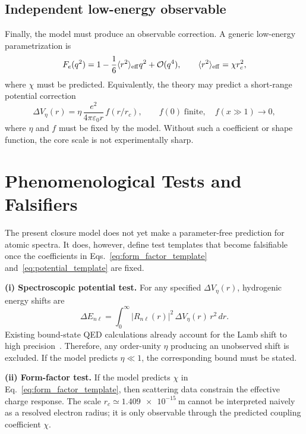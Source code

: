 \documentclass[aps,pra,preprint,longbibliography,nofootinbib]{revtex4-2}
\begin{document}
\subsection{Independent low-energy observable}

Finally, the model must produce an observable correction.  A generic
low-energy parametrization is
\begin{equation}
  F_e(q^2)=1-\frac{1}{6}\langle r^2\rangle_{\rm eff}q^2+\mathcal{O}(q^4),
  \qquad
  \langle r^2\rangle_{\rm eff}=\chi r_c^2,
  \label{eq:form_factor_template}
\end{equation}
where $\chi$ must be predicted.  Equivalently, the theory may predict a
short-range potential correction
\begin{equation}
  \Delta V_\eta(r)=
  \eta\,\frac{e^2}{4\pi\varepsilon_0 r}\,f(r/r_c),
  \qquad f(0)\;\mathrm{finite},\quad f(x\gg1)\to0,
  \label{eq:potential_template}
\end{equation}
where $\eta$ and $f$ must be fixed by the model.  Without such a
coefficient or shape function, the core scale is not experimentally
sharp.

\section{Phenomenological Tests and Falsifiers}
\label{sec:falsifiers}

The present closure model does not yet make a parameter-free prediction
for atomic spectra.  It does, however, define test templates that become
falsifiable once the coefficients in Eqs.~\eqref{eq:form_factor_template}
and~\eqref{eq:potential_template} are fixed.

\medskip
\noindent\textbf{(i) Spectroscopic potential test.}
For any specified $\Delta V_\eta(r)$, hydrogenic energy shifts are
\begin{equation}
  \Delta E_{n\ell}
  = \int_0^\infty |R_{n\ell}(r)|^2\,\Delta V_\eta(r)\,r^2\,dr.
  \label{eq:lamb_template}
\end{equation}
Existing bound-state QED calculations already account for the Lamb
shift to high precision~\cite{Bethe1947,Karshenboim2005}.  Therefore,
any order-unity $\eta$ producing an unobserved shift is excluded.  If the
model predicts $\eta\ll1$, the corresponding bound must be stated.

\medskip
\noindent\textbf{(ii) Form-factor test.}
If the model predicts $\chi$ in Eq.~\eqref{eq:form_factor_template}, then
scattering data constrain the effective charge response.  The scale
$r_c\simeq\SI{1.409e-15}{\meter}$ cannot be interpreted naively as a
resolved electron radius; it is only observable through the predicted
coupling coefficient $\chi$.
\end{document}
